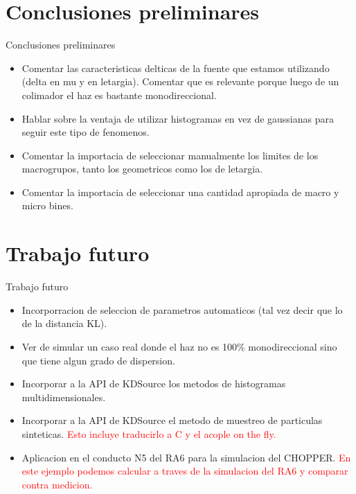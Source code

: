 \documentclass[aspectratio=169,english]{beamer}
\begin{document}
\section{Conclusiones preliminares}
\begin{frame}{Conclusiones preliminares}
    \begin{itemize}
        \item Comentar las caracteristicas delticas de la fuente que estamos utilizando (delta en mu y en letargia). Comentar que es relevante porque luego de un colimador el haz es bastante monodireccional.
        \item Hablar sobre la ventaja de utilizar histogramas en vez de gaussianas para seguir este tipo de fenomenos.
        \item Comentar la importacia de seleccionar manualmente los limites de los macrogrupos, tanto los geometricos como los de letargia.
        \item Comentar la importacia de seleccionar una cantidad apropiada de macro y micro bines.
    
    \end{itemize}

\end{frame}

\section{Trabajo futuro}
\begin{frame}{Trabajo futuro}

    \begin{itemize}
        \item Incorporracion de seleccion de parametros automaticos (tal vez decir que lo de la distancia KL).\\
        \item Ver de simular un caso real donde el haz no es 100\% monodireccional sino que tiene algun grado de dispersion.\\
        \item Incorporar a la API de KDSource los metodos de histogramas multidimensionales.\\
        \item Incorporar a la API de KDSource el metodo de muestreo de particulas sinteticas. \textcolor{red}{Esto incluye traducirlo a C y el acople on the fly.}\\
        \item Aplicacion en el conducto N5 del RA6 para la simulacion del CHOPPER. \textcolor{red}{En este ejemplo podemos calcular a traves de la simulacion del RA6 y comparar contra medicion.}\\
    \end{itemize}


\end{frame}
\end{document}
